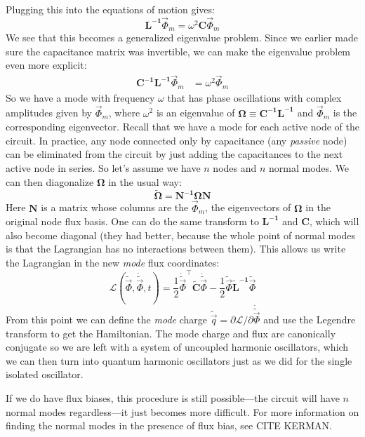 Plugging this into the equations of motion gives:
\begin{equation}
\mathbf{L^{-1}}\vec{\Phi}_m = \omega^2 \mathbf{C}\vec{\Phi}_m 
\end{equation}
We see that this becomes a generalized eigenvalue problem. Since we earlier made sure the capacitance matrix was invertible, we can make the eigenvalue problem even more explicit:
\begin{align}
\mathbf{C^{-1}}\mathbf{L^{-1}}\vec{\Phi}_m &=\omega^2 \vec{\Phi}_m
\end{align}
So we have a mode with frequency $\omega$ that has phase oscillations with complex amplitudes given by $\vec{\Phi}_m$, where $\omega^2$ is an eigenvalue of $\mathbf{\Omega}\equiv\mathbf{C^{-1}}\mathbf{L^{-1}}$ and $\vec{\Phi}_m$ is the corresponding eigenvector. Recall that we have a mode for each active node of the circuit. In practice, any node connected only by capacitance (any \textit{passive} node) can be eliminated from the circuit by just adding the capacitances to the next active node in series. So let's assume we have $n$ nodes and $n$ normal modes. We can then diagonalize $\mathbf{\Omega}$ in the usual way:
\begin{equation}
\mathbf{\tilde{\Omega}} = \mathbf{N^{-1} \Omega N}
\end{equation}
Here $\mathbf{N}$ is a matrix whose columns are the $\vec{\Phi}_m$, the eigenvectors of $\mathbf{\Omega}$ in the original node flux basis. One can do the same transform to $\mathbf{L^{-1}}$ and $\mathbf{C}$, which will also become diagonal (they had better, because the whole point of normal modes is that the Lagrangian has no interactions between them). This allows us write the Lagrangian in the new \textit{mode} flux coordinates:
\begin{equation}
\mathcal{L}(\tilde{\vec{\Phi}}, \dot{\tilde{\vec{\Phi}}},t) = \frac{1}{2}\dot{\tilde{\vec{\Phi}}}^\top \mathbf{\tilde{C}}\dot{\tilde{\vec{\Phi}}} - \frac{1}{2}\tilde{\vec{\Phi}}\mathbf{\tilde{L}^{-1}}\tilde{\vec{\Phi}}
\end{equation}
From this point we can define the \textit{mode} charge $\tilde{\vec{q}} = \partial\mathcal{L}/\partial\dot{\tilde{\vec{\Phi}}}$ and use the Legendre transform to get the Hamiltonian. The mode charge and flux are canonically conjugate so we are left with a system of uncoupled harmonic oscillators, which we can then turn into quantum harmonic oscillators just as we did for the single isolated oscillator.

If we do have flux biases, this procedure is still possible---the circuit will have $n$ normal modes regardless---it just becomes more difficult. For more information on finding the normal modes in the presence of flux bias, see CITE KERMAN.

